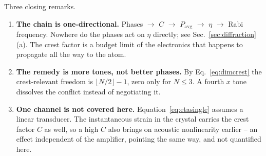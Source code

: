 \documentclass[11pt,a4paper]{article}
\newcommand{\crest}{\ensuremath{C}}
\newcommand{\Pavg}{\ensuremath{P_\mathrm{avg}}}
\begin{document}
\medskip
\noindent Three closing remarks.
\begin{enumerate}\itemsep0.2em
  \item \textbf{The chain is one-directional.} Phases $\to$ \crest{} $\to$
        \Pavg{} $\to$ $\eta$ $\to$ Rabi frequency. Nowhere do the phases act
        on $\eta$ directly; see Sec.~\ref{sec:diffraction}(a). The crest
        factor is a budget limit of the electronics that happens to
        propagate all the way to the atom.
  \item \textbf{The remedy is more tones, not better phases.} By
        Eq.~\eqref{eq:dimcrest} the crest-relevant freedom is
        $\lfloor N/2\rfloor-1$, zero only for $N\le3$. A fourth $x$ tone
        dissolves the conflict instead of negotiating it.
  \item \textbf{One channel is not covered here.} Equation~\eqref{eq:etasingle}
        assumes a linear transducer. The instantaneous strain in the crystal
        carries the crest factor \crest{} as well, so a high \crest{} also
        brings on acoustic nonlinearity earlier -- an effect independent of
        the amplifier, pointing the same way, and not quantified here.
\end{enumerate}
\end{document}
